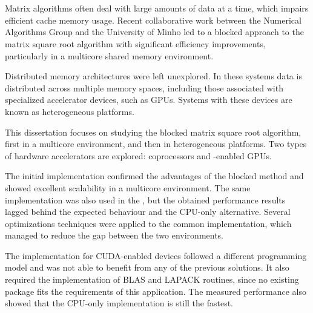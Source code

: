 \documentclass[../thesis]{subfiles}
\begin{document}
	\chapter*{\abstractname}

	Matrix algorithms often deal with large amounts of data at a time, which impairs efficient cache memory usage. Recent collaborative work between the Numerical Algorithms Group and the University of Minho led to a blocked approach to the matrix square root algorithm with significant efficiency improvements, particularly in a multicore shared memory environment. 

	Distributed memory architectures were left unexplored. In these systems data is distributed across multiple memory spaces, including those associated with specialized accelerator devices, such as GPUs. Systems with these devices are known as heterogeneous platforms.

	This dissertation focuses on studying the blocked matrix square root algorithm, first in a multicore environment, and then in heterogeneous platforms. Two types of hardware accelerators are explored: \intel\xeonphi coprocessors and \nvidia\cuda-enabled GPUs.

	The initial implementation confirmed the advantages of the blocked method and showed excellent scalability in a multicore environment. The same implementation was also used in the \intel\xeonphi, but the obtained performance results lagged behind the expected behaviour and the CPU-only alternative. Several optimizations techniques were applied to the common implementation, which managed to reduce the gap between the two environments.

	The implementation for CUDA-enabled devices followed a different programming model and was not able to benefit from any of the previous solutions. It also required the implementation of BLAS and LAPACK routines, since no existing package fits the requirements of this application. The measured performance also showed that the CPU-only implementation is still the fastest.
\end{document}
